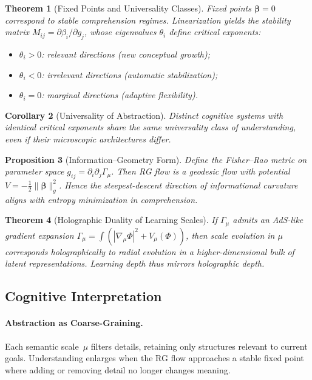 \documentclass[12pt,a4paper,twoside,openright]{book}
\newtheorem{theorem}{Theorem}
\newtheorem{proposition}[theorem]{Proposition}
\newtheorem{corollary}[theorem]{Corollary}
\begin{document}
\begin{theorem}[Fixed Points and Universality Classes]
\label{thm:fixedpoints}
Fixed points $\boldsymbol{\beta}=0$ correspond to stable comprehension regimes.
Linearization yields the stability matrix
$M_{ij}=\partial\beta_i/\partial g_j$,
whose eigenvalues $\theta_i$ define critical exponents:
\begin{itemize}
\item $\theta_i>0$: relevant directions (new conceptual growth);
\item $\theta_i<0$: irrelevant directions (automatic stabilization);
\item $\theta_i=0$: marginal directions (adaptive flexibility).
\end{itemize}
\end{theorem}

\begin{corollary}[Universality of Abstraction]
Distinct cognitive systems with identical critical exponents
share the same universality class of understanding,
even if their microscopic architectures differ.
\end{corollary}

\begin{proposition}[Information–Geometry Form]
Define the Fisher–Rao metric on parameter space
$g_{ij}=\partial_i\partial_j \Gamma_\mu$.
Then RG flow is a geodesic flow with potential
$V=-\tfrac12\|\boldsymbol{\beta}\|^2_g$.
Hence the steepest-descent direction of informational curvature
aligns with entropy minimization in comprehension.
\end{proposition}

\begin{theorem}[Holographic Duality of Learning Scales]
If $\Gamma_\mu$ admits an AdS-like gradient expansion
$\Gamma_\mu=\int (|\nabla_\mu \Phi|^2+V_\mu(\Phi))$,
then scale evolution in $\mu$ corresponds holographically
to radial evolution in a higher-dimensional bulk of latent representations.
Learning depth thus mirrors holographic depth.
\end{theorem}

\subsection*{Cognitive Interpretation}

\paragraph{Abstraction as Coarse-Graining.}
Each semantic scale~$\mu$ filters details,
retaining only structures relevant to current goals.
Understanding enlarges when the RG flow approaches a stable fixed point
where adding or removing detail no longer changes meaning.
\end{document}

